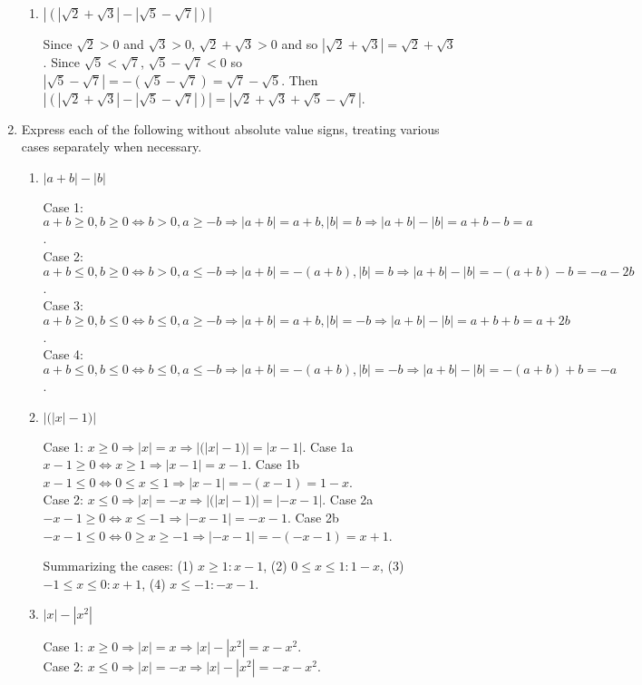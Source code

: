 \documentclass[12pt]{article}
\newcommand{\then}{\Rightarrow}
\newcommand{\abs}[1]{|#1|}
\begin{document}
\begin{enumerate}
\begin{enumerate}[label=(\roman*)]
\item $\abs{(\abs{\sqrt{2}+\sqrt{3}}-\abs{\sqrt{5}-\sqrt{7}})}$

Since $\sqrt{2}>0$ and $\sqrt{3}>0$, $\sqrt{2}+\sqrt{3}>0$ and so $\abs{\sqrt{2}+\sqrt{3}}=\sqrt{2}+\sqrt{3}$. Since $\sqrt{5}<\sqrt{7}$, $\sqrt{5}-\sqrt{7}<0$ so $\abs{\sqrt{5}-\sqrt{7}}=-(\sqrt{5}-\sqrt{7})=\sqrt{7}-\sqrt{5}$. Then $\abs{(\abs{\sqrt{2}+\sqrt{3}}-\abs{\sqrt{5}-\sqrt{7}})}=\abs{\sqrt{2}+\sqrt{3}+\sqrt{5}-\sqrt{7}}$.
\end{enumerate}

\item Express each of the following without absolute value signs, treating various cases separately when necessary.
\begin{enumerate}[label=(\roman*)]
\item $\abs{a+b}-\abs{b}$

Case 1: $a+b\geq 0,b\geq 0\iff b>0,a\geq -b\then \abs{a+b}=a+b, \abs{b}=b\then\abs{a+b}-\abs{b}=a+b-b=a$.\\
Case 2: $a+b\leq 0,b\geq 0\iff b>0,a\leq -b\then \abs{a+b}=-(a+b), \abs{b}=b\then\abs{a+b}-\abs{b}=-(a+b)-b=-a-2b$.\\
Case 3: $a+b\geq 0,b\leq 0\iff b\leq 0,a\geq -b\then \abs{a+b}=a+b,\abs{b}=-b\then\abs{a+b}-\abs{b}=a+b+b=a+2b$.\\
Case 4: $a+b\leq 0,b\leq 0\iff b\leq 0,a\leq -b\then \abs{a+b}=-(a+b),\abs{b}=-b\then\abs{a+b}-\abs{b}=-(a+b)+b=-a$.

\item $\abs{({\abs{x}-1)}}$

Case 1: $x\geq 0\then \abs{x}=x\then\abs{({\abs{x}-1)}}=\abs{x-1}$. Case 1a $x-1\geq 0\iff x\geq 1\then \abs{x-1}=x-1$. Case 1b $x-1\leq 0\iff 0\leq x\leq 1\then \abs{x-1}=-(x-1)=1-x$.\\
Case 2: $x\leq 0\then\abs{x}=-x\then\abs{({\abs{x}-1)}}=\abs{-x-1}$. Case 2a $-x-1\geq 0\iff x\leq -1\then\abs{-x-1}=-x-1$. Case 2b $-x-1\leq 0\iff 0\geq x\geq -1\then\abs{-x-1}=-(-x-1)=x+1$.

Summarizing the cases: (1) $x\geq 1: x-1$, (2) $0\leq x \leq 1: 1-x$, (3) $-1\leq x \leq 0: x+1$, (4) $x\leq -1: -x-1$.

\item $\abs{x}-\abs{x^{2}}$

Case 1: $x\geq 0\then \abs{x}=x\then \abs{x}-\abs{x^{2}}=x-x^2$.\\
Case 2: $x\leq 0\then \abs{x}=-x\then \abs{x}-\abs{x^{2}}=-x-x^2$.


\end{enumerate}
\end{enumerate}
\end{document}
